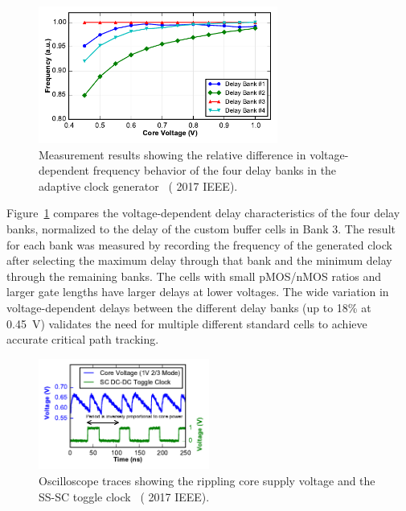 \documentclass[graybox]{svmult}
\begin{document}
\begin{figure}
  \centering
  \includegraphics[width=0.7\textwidth]{6-raven4-clockgen-trc}
  \caption{Measurement results showing the relative difference in voltage-dependent frequency behavior of the four delay banks in the adaptive clock generator~\cite{Keller2017} ({\textcopyright} 2017 IEEE).}
  \label{fig:6-raven4-clockgen-trc}
\end{figure}

Figure~\ref{fig:6-raven4-clockgen-trc} compares the voltage-dependent delay characteristics of the four delay banks, normalized to the delay of the custom buffer cells in Bank 3.
The result for each bank was measured by recording the frequency of the generated clock after selecting the maximum delay through that bank and the minimum delay through the remaining banks.
The cells with small pMOS/nMOS ratios and larger gate lengths have larger delays at lower voltages.
The wide variation in voltage-dependent delays between the different delay banks (up to 18\% at \SI{0.45}{\volt}) validates the need for multiple different standard cells to achieve accurate critical path tracking.

\begin{figure}
  \centering
  \includegraphics[width=0.5\textwidth]{6-raven4-waveforms-powermeas}
  \caption{Oscilloscope traces showing the rippling core supply voltage and the SS-SC toggle clock~\cite{Keller2017} ({\textcopyright} 2017 IEEE).}
  \label{fig:6-raven4-waveforms-powermeas}
\end{figure}
\end{document}

